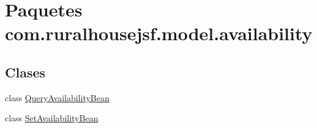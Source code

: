 \hypertarget{a00120}{}\section{Paquetes com.\+ruralhousejsf.\+model.\+availability}
\label{a00120}
\subsection*{Clases}
\begin{DoxyCompactItemize}
\item 
class \mbox{\hyperlink{a00224}{Query\+Availability\+Bean}}
\item 
class \mbox{\hyperlink{a00228}{Set\+Availability\+Bean}}
\end{DoxyCompactItemize}
